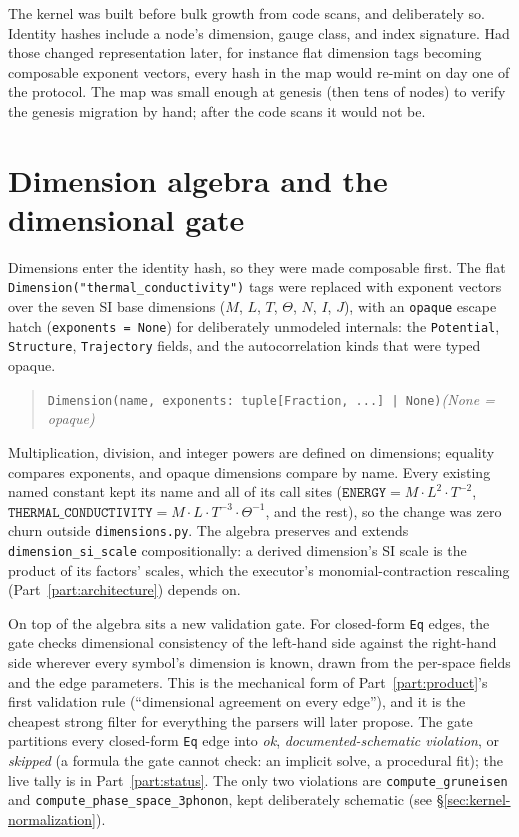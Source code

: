 \documentclass[11pt,a4paper]{article}
\begin{document}
The kernel was built before bulk growth from code scans, and deliberately so.
Identity hashes include a node's dimension, gauge class, and index signature. Had
those changed representation later, for instance flat dimension tags becoming
composable exponent vectors, every hash in the map would re-mint on day one of
the protocol. The map was small enough at genesis (then tens of nodes) to
verify the genesis migration by hand; after the code scans it would not
be.

\section{Dimension algebra and the dimensional gate}
\label{sec:kernel-dimensions}

Dimensions enter the identity hash, so they were made composable first. The flat
\texttt{Dimension("thermal\_conductivity")} tags were replaced with exponent
vectors over the seven SI base dimensions ($M$, $L$, $T$, $\Theta$, $N$, $I$,
$J$), with an \texttt{opaque} escape hatch (\texttt{exponents = None}) for
deliberately unmodeled internals: the \texttt{Potential}, \texttt{Structure},
\texttt{Trajectory} fields, and the autocorrelation kinds that were typed opaque.
\begin{quote}
\texttt{Dimension(name, exponents: tuple[Fraction, ...] | None)}\quad\emph{(None = opaque)}
\end{quote}
Multiplication, division, and integer powers are defined on dimensions; equality
compares exponents, and opaque dimensions compare by name. Every existing named
constant kept its name and all of its call sites ($\mathtt{ENERGY} = M\cdot
L^2\cdot T^{-2}$, $\mathtt{THERMAL\_CONDUCTIVITY} = M\cdot L\cdot T^{-3}\cdot
\Theta^{-1}$, and the rest), so the change was zero churn outside
\texttt{dimensions.py}. The algebra preserves and extends \texttt{dimension\_si\_scale}
compositionally: a derived dimension's SI scale is the product of its factors'
scales, which the executor's monomial-contraction rescaling (Part~\ref{part:architecture})
depends on.

On top of the algebra sits a new validation gate. For closed-form \texttt{Eq}
edges, the gate checks dimensional consistency of the left-hand side against the
right-hand side wherever every symbol's dimension is known, drawn from the
per-space fields and the edge parameters. This is the mechanical form of
Part~\ref{part:product}'s first validation rule (``dimensional agreement on every
edge''), and it is the cheapest strong filter for everything the parsers will
later propose. The gate partitions every closed-form \texttt{Eq} edge into
\emph{ok}, \emph{documented-schematic violation}, or \emph{skipped} (a formula the
gate cannot check: an implicit solve, a procedural fit); the live tally is in
Part~\ref{part:status}. The only two violations are
\texttt{compute\_gruneisen} and \texttt{compute\_phase\_space\_3phonon}, kept
deliberately schematic (see \S\ref{sec:kernel-normalization}).
\end{document}
